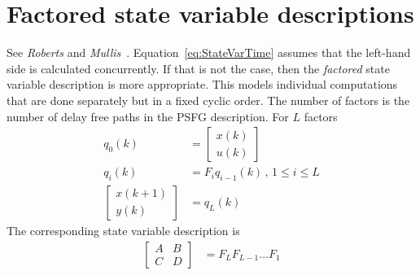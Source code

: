 \documentclass[a4paper,twoside,10pt,english]{report}
\begin{document}
\chapter{\label{sec:Factored-state-variable-descriptions}Factored state variable descriptions}
See \emph{Roberts} and
\emph{Mullis}~\cite[Section 8.4]{RobertsMullis_DigitalSignalProcessing}.
Equation~\ref{eq:StateVarTime} assumes that the left-hand side
is calculated concurrently. If that is not the case, then the \emph{factored} 
state variable description is more appropriate. This models individual
computations that are done separately but in a fixed cyclic order. The number
of factors is the number of delay free paths in the PSFG description. For $L$
factors
\begin{align*}
q_{0}\left(k\right) &= \left[\begin{array}{c}
x\left(k\right)\\
u\left(k\right)
\end{array}\right]\\
q_{i}\left(k\right) &= F_{i}q_{i-1}\left(k\right)\,,\,1\leq{}i\leq{}L\\
\left[\begin{array}{c}
x\left(k+1\right)\\
y\left(k\right)
\end{array}\right] &= q_{L}\left(k\right)
\end{align*}
The corresponding state variable description is
\begin{align*}
\left[\begin{array}{cc}
A & B\\
C & D
\end{array}\right] &= F_{L}F_{L-1}\ldots F_{1}
\end{align*}
\end{document}

